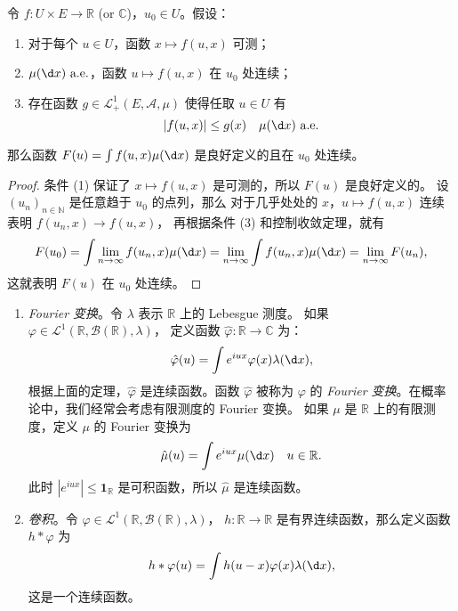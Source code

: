 \documentclass[fontset=none]{Notes}
\newcommand{\indicator}[1]{\mathbold 1_{#1}}
\newcommand{\alev}[1]{\text{$#1$ a.e.}}
\begin{document}
\begin{theorem}[含参积分的连续性]
  令 $f:U\times E\to \mathbb{R}$ (or $\mathbb{C}$)，$u_0\in U$。假设：
  \begin{enumerate}
    \item 对于每个 $u\in U$，函数 $x\mapsto f(u,x)$ 可测；
    \item $\alev{\mu(\d x)}$，函数 $u\mapsto f(u,x)$ 在 $u_0$ 处连续；
    \item 存在函数 $g\in \mathcal{L}_+^1(E,\mathcal{A},\mu)$
    使得任取 $u\in U$ 有
    \[
      |f(u,x)|\leq g(x)\quad \alev{\mu(\d x)}  
    \]
  \end{enumerate}
  那么函数 $F(u)=\int f(u,x)\mu(\d x)$ 是良好定义的且在 $u_0$
  处连续。
\end{theorem}
\begin{proof}
  条件 (1) 保证了 $x\mapsto f(u,x)$ 是可测的，所以 $F(u)$ 是良好定义的。
  设 $(u_n)_{n\in \mathbb{N}}$ 是任意趋于 $u_0$ 的点列，那么 
  对于几乎处处的 $x$，$u\mapsto f(u,x)$ 连续表明 $f(u_n,x)\to f(u,x)$，
  再根据条件 (3) 和控制收敛定理，就有
  \[
    F(u_0)=\int \lim_{n\to\infty} f(u_n,x)\mu(\d x)
    =  \lim_{n\to\infty}\int f(u_n,x)\mu(\d x)=\lim_{n\to\infty}F(u_n),
  \]
  这就表明 $F(u)$ 在 $u_0$ 处连续。
\end{proof}

\begin{example}
  \mbox{}
  \begin{enumerate}
    \item \emph{Fourier 变换}。令 $\lambda$ 表示 $\mathbb{R}$ 上的 Lebesgue 测度。
    如果 $\varphi\in \mathcal{L}^1(\mathbb{R},\mathcal{B}(\mathbb{R}),\lambda)$，
    定义函数 $\hat\varphi:\mathbb{R}\to \mathbb{C}$ 为：
    \[
      \hat\varphi(u)=\int e^{iux}\varphi(x)\lambda(\d x),  
    \]
    根据上面的定理，$\hat\varphi$ 是连续函数。函数 $\hat\varphi$ 被称为 $\varphi$
    的 \emph{Fourier 变换}。在概率论中，我们经常会考虑有限测度的 Fourier 变换。
    如果 $\mu$ 是 $\mathbb{R}$ 上的有限测度，定义 $\mu$ 的 Fourier 变换为
    \[
      \hat{\mu}(u)=\int e^{iux}\mu(\d x)\quad u\in \mathbb{R}.  
    \]
    此时 $|e^{iux}|\leq \indicator{\mathbb{R}}$ 是可积函数，所以
    $\hat\mu$ 是连续函数。
    \item \emph{卷积}。令 $\varphi\in \mathcal{L}^1(\mathbb{R},\mathcal{B}(\mathbb{R}),\lambda)$，
    $h: \mathbb{R}\to \mathbb{R}$ 是有界连续函数，那么定义函数 $h*\varphi$ 为
    \[
      h*\varphi(u)=\int h(u-x)\varphi(x)\lambda(\d x),  
    \]
    这是一个连续函数。
  \end{enumerate}
\end{example}
\end{document}
